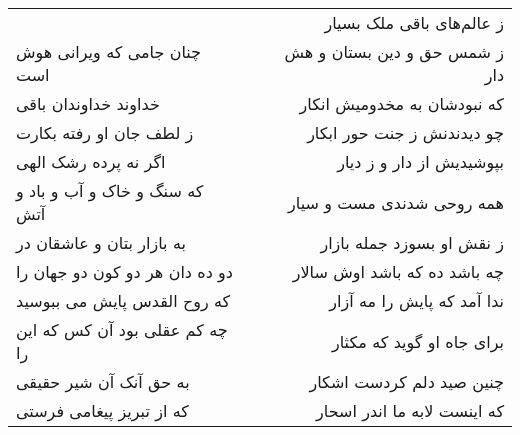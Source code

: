 \begin{center}
\begin{longtable}{l p{0.5cm} r}
&&
ز عالم‌های باقی ملک بسیار
\\
چنان جامی که ویرانی هوش است
&&
ز شمس حق و دین بستان و هش دار
\\
خداوند خداوندان باقی
&&
که نبودشان به مخدومیش انکار
\\
ز لطف جان او رفته بکارت
&&
چو دیدندنش ز جنت حور ابکار
\\
اگر نه پرده رشک الهی
&&
بپوشیدیش از دار و ز دیار
\\
که سنگ و خاک و آب و باد و آتش
&&
همه روحی شدندی مست و سیار
\\
به بازار بتان و عاشقان در
&&
ز نقش او بسوزد جمله بازار
\\
دو ده دان هر دو کون دو جهان را
&&
چه باشد ده که باشد اوش سالار
\\
که روح القدس پایش می ببوسید
&&
ندا آمد که پایش را مه آزار
\\
چه کم عقلی بود آن کس که این را
&&
برای جاه او گوید که مکثار
\\
به حق آنک آن شیر حقیقی
&&
چنین صید دلم کردست اشکار
\\
که از تبریز پیغامی فرستی
&&
که اینست لابه ما اندر اسحار
\\
\end{longtable}
\end{center}
